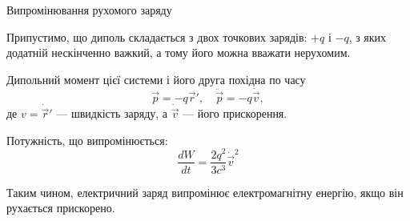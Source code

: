 \documentclass[onlytextwidth]{beamer}
\let\vect\vec
\begin{document}
\begin{frame}{Випромінювання рухомого заряду}{}
	\begin{overprint}
		\begin{block}{}\justifying
			Припустимо, що диполь складається з двох точкових зарядів: $ +q $ і $ -q $, з яких додатній нескінченно важкий, а тому його можна вважати нерухомим.
		\end{block}
		\begin{block}{}\centering
			\begin{pict}
			\end{pict}
		\end{block}
	\end{overprint}

	\medskip

	Дипольний момент цієї системи і його друга похідна по часу
	\begin{equation*}
		\vect{p} = -q\vect{r}', \quad \ddot{\vect{p}} = -q\dot{\vect{v}},
	\end{equation*}
	де $ v =  \dot{\vect{r}}'  $ --- швидкість заряду, а $ \dot{\vect{v}} $ --- його прискорення.

	Потужність, що випромінюється:
	\begin{equation*}
		\frac{d W}{dt}  = \frac{2q^2}{3c^3}\dot{\vect{v}}^2
	\end{equation*}

	\begin{alertblock}{}
		Таким чином, електричний заряд випромінює електромагнітну
		енергію, якщо він рухається прискорено.
	\end{alertblock}
\end{frame}
\end{document}
